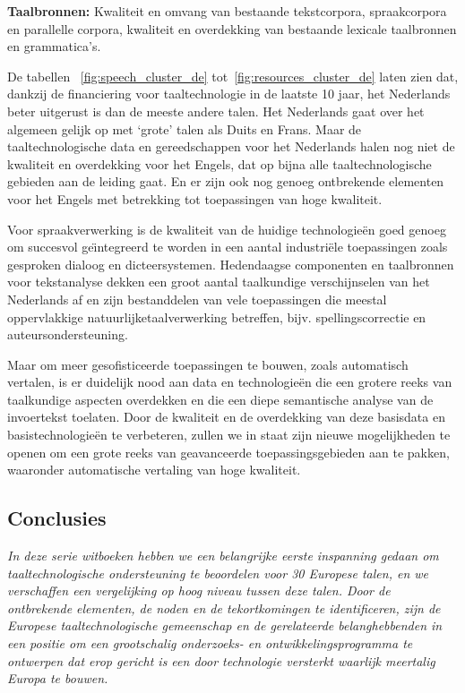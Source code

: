 \documentclass[]{../../metanetpaper}
\begin{document}
\begin{multicols}{2}
{\textbf{Taalbronnen:} Kwaliteit en omvang van bestaande tekstcorpora, spraakcorpora en parallelle corpora, kwaliteit en overdekking van bestaande lexicale taalbronnen en grammatica's.


De tabellen ~\ref{fig:speech_cluster_de} tot~\ref{fig:resources_cluster_de}  laten zien dat, dankzij de financiering voor taaltechnologie in de laatste 10 jaar, het Nederlands beter uitgerust is dan de meeste andere talen. Het Nederlands gaat over het algemeen gelijk op met `grote' talen als Duits en Frans. Maar de taaltechnologische data en gereedschappen voor het Nederlands halen nog niet de kwaliteit en overdekking voor het Engels, dat op bijna alle taaltechnologische gebieden aan de leiding gaat. En er zijn ook nog genoeg ontbrekende elementen voor het Engels met betrekking tot toepassingen van hoge kwaliteit.

   Voor spraakverwerking is de kwaliteit van de huidige technologie{\"e}n goed genoeg om succesvol ge{\"\i}ntegreerd te worden in een aantal industri{\"e}le toepassingen zoals gesproken dialoog en dicteersystemen. Hedendaagse componenten en taalbronnen voor tekstanalyse dekken een groot aantal taalkundige verschijnselen van het Nederlands af en zijn bestanddelen van vele toepassingen die meestal oppervlakkige natuurlijketaalverwerking betreffen, bijv. spellingscorrectie en auteursondersteuning.

   Maar om meer gesofisticeerde toepassingen te bouwen, zoals automatisch vertalen, is er duidelijk nood aan data en technologie{\"e}n die een grotere reeks van taalkundige aspecten overdekken en die een diepe semantische analyse van de invoertekst toelaten. Door de kwaliteit en de overdekking van deze basisdata en basistechnologie{\"e}n te verbeteren, zullen we in staat zijn nieuwe mogelijkheden te openen om een grote reeks van geavanceerde toepassingsgebieden aan te pakken, waaronder automatische vertaling van hoge kwaliteit.


\subsection{Conclusies}

\emph{In deze serie witboeken hebben we een belangrijke eerste inspanning gedaan om taaltechnologische ondersteuning te beoordelen voor 30 Europese talen, en we verschaffen een vergelijking op hoog niveau tussen deze talen. Door de ontbrekende elementen, de noden en de tekortkomingen te identificeren, zijn de Europese taaltechnologische gemeenschap en de gerelateerde belanghebbenden in een positie om een grootschalig onderzoeks- en ontwikkelingsprogramma te ontwerpen dat erop gericht is een door technologie versterkt waarlijk meertalig Europa te bouwen.}

}
\end{multicols}
\end{document}
